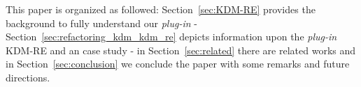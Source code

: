 


This paper is organized as followed: Section~\ref{sec:KDM-RE} provides the background to fully understand our \textit{plug-in} - Section~\ref{sec:refactoring_kdm_kdm_re} depicts information upon the \textit{plug-in} KDM-RE and an case study - in Section~\ref{sec:related} there are related works and in Section~\ref{sec:conclusion} we conclude the paper with some remarks and future directions.







